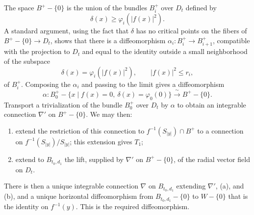 \begin{center}
\end{center}

The space $B^+-\{0\}$ is the union of the bundles $B_i^+$ over
$D_t$ defined by
\[
\delta(x)\geq\varphi_i(|f(x)|^2).
\]
A standard argument, using the fact that $\delta$ has no critical
points on the fibers of $B^+-\{0\}\to D_t$, shows that there is a
diffeomorphism $\alpha_i:B_i^+\to B_{i+1}^+$, compatible with the
projection to $D_t$ and equal to the identity outside a small
neighborhood of the subspace
\[
\delta(x)=\varphi_i(|f(x)|^2),
\qquad |f(x)|^2\leq r_i,
\]
of $B_i^+$.  Composing the $\alpha_i$ and passing to the limit gives
a diffeomorphism
\[
\alpha:B_0^+-\{x\mid f(x)=0,\ \delta(x)=\varphi_0(0)\}
\xrightarrow{\ \sim\ }B^+-\{0\}.
\]
Transport a trivialization of the bundle $B_0^+$ over $D_t$ by
$\alpha$ to obtain an integrable connection $\nabla'$ on
$B^+-\{0\}$.  We may then:

\begin{enumerate}[label=(\alph*)]
\item extend the restriction of this connection to
  $f^{-1}(S_{|y|})\cap B^+$ to a connection on
  $f^{-1}(S_{|y|})/S_{|y|}$; this extension gives $T_1$;
\item extend to $B_{t_0,d_1}$ the lift, supplied by $\nabla'$ on
  $B^+-\{0\}$, of the radial vector field on $D_t$.
\end{enumerate}

There is then a unique integrable connection $\nabla$ on
$B_{t_0,d_1}$ extending $\nabla'$, (a), and (b), and a unique
horizontal diffeomorphism from $B_{t_0,d_1}-\{0\}$ to $W-\{0\}$
that is the identity on $f^{-1}(y)$.  This is the required
diffeomorphism.

